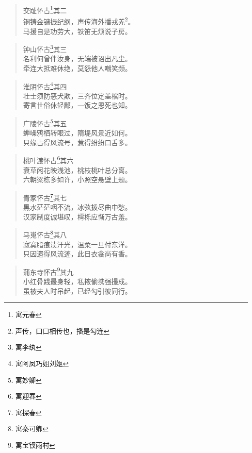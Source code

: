 \documentclass[12pt,oneside]{book}
\newenvironment{shici}{%
\begin{verse}%
\centering\large\hspace{12pt}}%
{\end{verse}}
\begin{document}
\begin{shici}
交趾怀古\footnote{寓元春}其二\\
铜铸金镛振纪纲，声传海外播戎羌\footnote{声传，口口相传也，播是勾连}。\\
马援自是功劳大，铁笛无烦说子房。
\end{shici}

\begin{shici}
钟山怀古\footnote{寓李纨}其三\\
名利何曾伴汝身，无端被诏出凡尘。\\
牵连大抵难休绝，莫怨他人嘲笑频。
\end{shici}

\begin{shici}
淮阴怀古\footnote{寓阿凤巧姐刘妪}其四\\
壮士须防恶犬欺，三齐位定盖棺时。\\
寄言世俗休轻鄙，一饭之恩死也知。
\end{shici}

\begin{shici}
广陵怀古\footnote{寓妙卿}其五\\
蝉噪鸦栖转眼过，隋堤风景近如何。\\
只缘占得风流号，惹得纷纷口舌多。
\end{shici}

\begin{shici}
桃叶渡怀古\footnote{寓迎春}其六\\
衰草闲花映浅池，桃枝桃叶总分离。\\
六朝梁栋多如许，小照空悬壁上题。
\end{shici}

\begin{shici}
青冢怀古\footnote{寓探春}其七\\
黑水茫茫咽不流，冰弦拨尽曲中愁。\\
汉家制度诚堪叹，樗栎应惭万古羞。
\end{shici}

\begin{shici}
马嵬怀古\footnote{寓秦可卿}其八\\
寂寞脂痕渍汗光，温柔一旦付东洋。\\
只因遗得风流迹，此日衣衾尚有香。
\end{shici}

\begin{shici}
蒲东寺怀古\footnote{寓宝钗雨村}其九\\
小红骨践最身轻，私掖偷携强撮成。\\
虽被夫人时吊起，已经勾引彼同行。
\end{shici}
\end{document}
